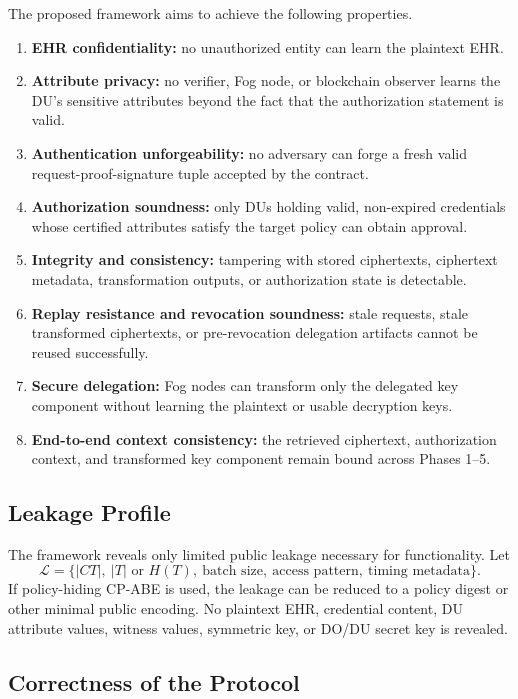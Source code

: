 \documentclass[conference]{IEEEtran}
\begin{document}
The proposed framework aims to achieve the following properties.

\begin{enumerate}
    \item \textbf{EHR confidentiality:} no unauthorized entity can learn the plaintext EHR.
    \item \textbf{Attribute privacy:} no verifier, Fog node, or blockchain observer learns the DU's sensitive attributes beyond the fact that the authorization statement is valid.
    \item \textbf{Authentication unforgeability:} no adversary can forge a fresh valid request-proof-signature tuple accepted by the contract.
    \item \textbf{Authorization soundness:} only DUs holding valid, non-expired credentials whose certified attributes satisfy the target policy can obtain approval.
    \item \textbf{Integrity and consistency:} tampering with stored ciphertexts, ciphertext metadata, transformation outputs, or authorization state is detectable.
    \item \textbf{Replay resistance and revocation soundness:} stale requests, stale transformed ciphertexts, or pre-revocation delegation artifacts cannot be reused successfully.
    \item \textbf{Secure delegation:} Fog nodes can transform only the delegated key component without learning the plaintext or usable decryption keys.
    \item \textbf{End-to-end context consistency:} the retrieved ciphertext, authorization context, and transformed key component remain bound across Phases 1--5.
\end{enumerate}

\subsection{Leakage Profile}

The framework reveals only limited public leakage necessary for functionality. Let
\[
\mathcal{L} = \{ |CT|,\ |T| \text{ or } H(T),\ \text{batch size},\ \text{access pattern},\ \text{timing metadata} \}.
\]
If policy-hiding CP-ABE is used, the leakage can be reduced to a policy digest or other minimal public encoding. No plaintext EHR, credential content, DU attribute values, witness values, symmetric key, or DO/DU secret key is revealed.

\subsection{Correctness of the Protocol}
\end{document}

